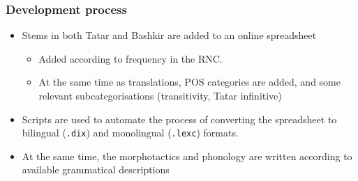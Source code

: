 \documentclass[10pt,xetex]{beamer} %
\begin{document}
\begin{frame}
  \frametitle{Development process}

  \begin{itemize} %
    \item Stems in both Tatar and Bashkir are added to an online spreadsheet
    \begin{itemize}
      \item Added according to frequency in the RNC. %
      \item At the same time as translations, POS categories are added, and some
        relevant subcategorisations (transitivity, Tatar infinitive)
    \end{itemize}
    \item Scripts are used to automate the process of converting the spreadsheet
       to bilingual ({\small {\tt .dix}}) and monolingual ({\small {\tt .lexc}}) formats.
    \item At the same time, the morphotactics and phonology are written
       according to available grammatical descriptions
    
  \end{itemize}
\end{frame}
\end{document}

